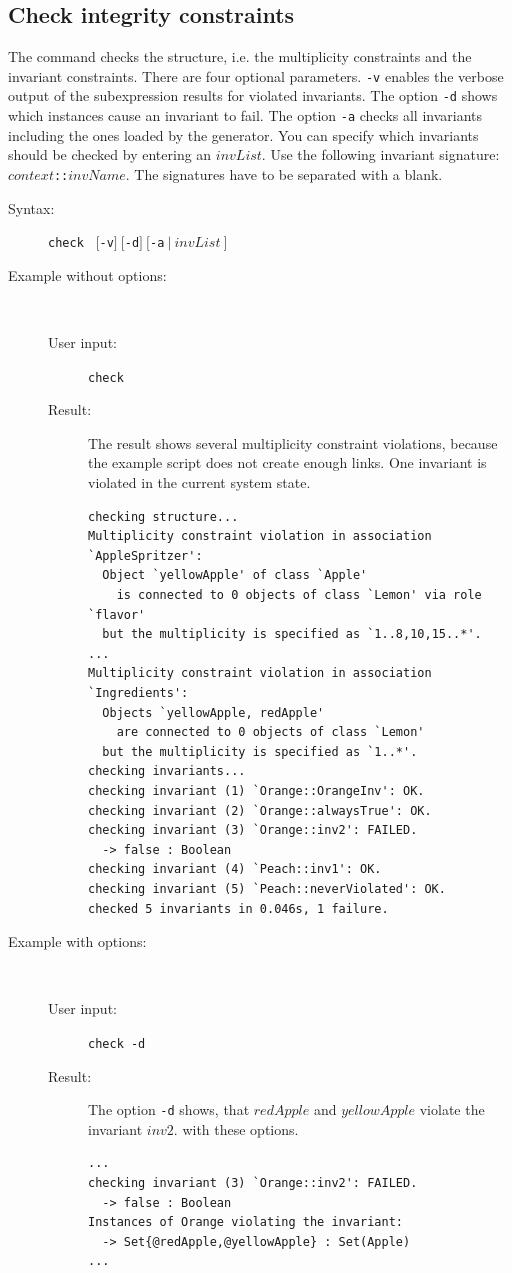\documentclass[a4paper,titlepage,oneside,final]{scrreprt} %
\begin{document}
\subsection{Check integrity constraints}
The command checks the structure, i.e. the multiplicity constraints and the invariant constraints.
There are four optional parameters. \verb+-v+ enables the verbose output of the subexpression results for violated
invariants. The option \verb+-d+ shows which instances cause an invariant to fail. The option
\verb+-a+ checks all invariants
including the ones loaded by the generator. You can specify which invariants should
be checked by entering an $\mathit{invList}$.
Use the following invariant signature: $\mathit{context}$\verb+::+$\mathit{invName}$.
The signatures have to be separated with a blank.
\begin{description}
\item[Syntax:] \verb+check + $[$\verb+-v+$]~[$\verb+-d+$]~[$\verb+-a+$~|~\mathit{invList}~]$
\item[Example without options:]~
\begin{description}
\item[User input:] \verb+check+
\item[Result:]The result shows several multiplicity constraint violations,
because the example script does not create enough links. One invariant is violated
in the current system state.
\begin{verbatim}
checking structure...
Multiplicity constraint violation in association `AppleSpritzer':
  Object `yellowApple' of class `Apple'
    is connected to 0 objects of class `Lemon' via role `flavor'
  but the multiplicity is specified as `1..8,10,15..*'.
...
Multiplicity constraint violation in association `Ingredients':
  Objects `yellowApple, redApple'
    are connected to 0 objects of class `Lemon'
  but the multiplicity is specified as `1..*'.
checking invariants...
checking invariant (1) `Orange::OrangeInv': OK.
checking invariant (2) `Orange::alwaysTrue': OK.
checking invariant (3) `Orange::inv2': FAILED.
  -> false : Boolean
checking invariant (4) `Peach::inv1': OK.
checking invariant (5) `Peach::neverViolated': OK.
checked 5 invariants in 0.046s, 1 failure.
\end{verbatim}
\end{description}
\item[Example with options:]~
\begin{description}
\item[User input:] \verb+check -d+
\item[Result:] The option \verb+-d+ shows, that $\mathit{redApple}$ and $\mathit{yellowApple}$
violate the invariant $\mathit{inv2}$.
with these options.
\begin{verbatim}
...
checking invariant (3) `Orange::inv2': FAILED.
  -> false : Boolean
Instances of Orange violating the invariant:
  -> Set{@redApple,@yellowApple} : Set(Apple)
...
\end{verbatim}
\end{description}
\end{description}
\end{document}
